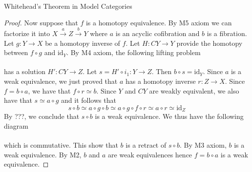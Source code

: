 \documentclass[a4paper]{article}
\begin{document}
\begin{thm}{Whitehead's Theorem in Model Categories}{}
\begin{proof}
Now suppose that $f$ is a homotopy equivalence. By M5 axiom we can factorize it into $X\overset{a}{\longrightarrow}Z\overset{b}{\longrightarrow}Y$ where $a$ is an acyclic cofibration and $b$ is a fibration. Let $g:Y\to X$ be a homotopy inverse of $f$. Let $H:CY\to Y$ provide the homotopy between $f\circ g$ and $\text{id}_Y$. By M4 axiom, the following lifting problem \\
\\ 
has a solution $H':CY\to Z$. Let $s=H'\circ i_1:Y\to Z$. Then $b\circ s=\text{id}_Y$. Since $a$ is a weak equivalence, we just proved that $a$ has a homotopy inverse $r:Z\to X$. Since $f=b\circ a$, we have that $f\circ r\simeq b$. Since $Y$ and $CY$ are weakly equivalent, we also have that $s\simeq a\circ g$ and it follows that $$s\circ b\simeq a\circ g\circ b\simeq a\circ g\circ f\circ r\simeq a\circ r\simeq\text{id}_Z$$ By ???, we conclude that $s\circ b$ is a weak equivalence. We thus have the following diagram \\
\\ 
which is commutative. This show that $b$ is a retract of $s\circ b$. By M3 axiom, $b$ is a weak equivalence. By M2, $b$ and $a$ are weak equivalences hence $f=b\circ a$ is a weak equivalence. 
\end{proof}
\end{thm}
\end{document}
